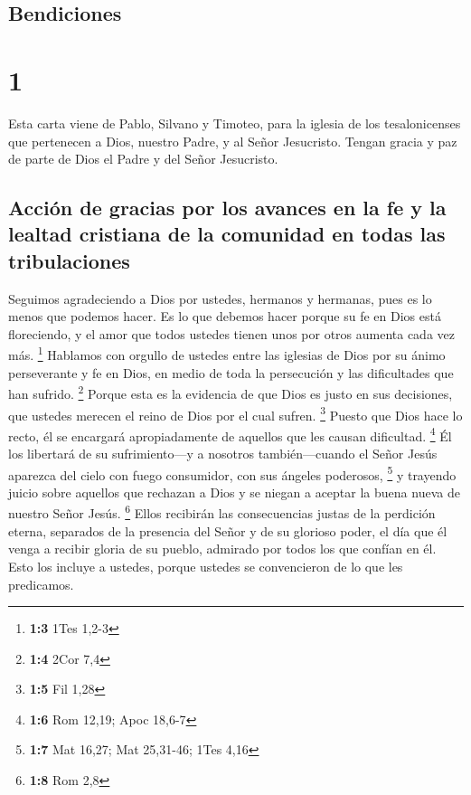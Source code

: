 \hypertarget{bendiciones}{%
\subsection{Bendiciones}\label{bendiciones}}

\hypertarget{section}{%
\section{1}\label{section}}

 Esta carta viene de Pablo, Silvano y Timoteo, para la
iglesia de los tesalonicenses que pertenecen a Dios, nuestro Padre, y al
Señor Jesucristo.  Tengan gracia y paz de parte de Dios el
Padre y del Señor Jesucristo.

\hypertarget{acciuxf3n-de-gracias-por-los-avances-en-la-fe-y-la-lealtad-cristiana-de-la-comunidad-en-todas-las-tribulaciones}{%
\subsection{Acción de gracias por los avances en la fe y la lealtad
cristiana de la comunidad en todas las
tribulaciones}\label{acciuxf3n-de-gracias-por-los-avances-en-la-fe-y-la-lealtad-cristiana-de-la-comunidad-en-todas-las-tribulaciones}}

 Seguimos agradeciendo a Dios por ustedes, hermanos y
hermanas, pues es lo menos que podemos hacer. Es lo que debemos hacer
porque su fe en Dios está floreciendo, y el amor que todos ustedes
tienen unos por otros aumenta cada vez más. \footnote{\textbf{1:3} 1Tes
  1,2-3}  Hablamos con orgullo de ustedes entre las
iglesias de Dios por su ánimo perseverante y fe en Dios, en medio de
toda la persecución y las dificultades que han sufrido. \footnote{\textbf{1:4}
  2Cor 7,4}  Porque esta es la evidencia de que Dios es
justo en sus decisiones, que ustedes merecen el reino de Dios por el
cual sufren. \footnote{\textbf{1:5} Fil 1,28}  Puesto que
Dios hace lo recto, él se encargará apropiadamente de aquellos que les
causan dificultad. \footnote{\textbf{1:6} Rom 12,19; Apoc 18,6-7}
 Él los libertará de su sufrimiento---y a nosotros
también---cuando el Señor Jesús aparezca del cielo con fuego consumidor,
con sus ángeles poderosos, \footnote{\textbf{1:7} Mat 16,27; Mat
  25,31-46; 1Tes 4,16}  y trayendo juicio sobre aquellos
que rechazan a Dios y se niegan a aceptar la buena nueva de nuestro
Señor Jesús. \footnote{\textbf{1:8} Rom 2,8}  Ellos
recibirán las consecuencias justas de la perdición eterna, separados de
la presencia del Señor y de su glorioso poder,  el día
que él venga a recibir gloria de su pueblo, admirado por todos los que
confían en él. Esto los incluye a ustedes, porque ustedes se
convencieron de lo que les predicamos.

